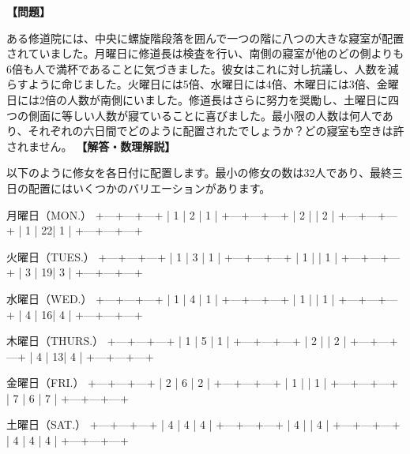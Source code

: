 \documentclass[10pt,a4paper,oneside,openany]{ltjsbook}
\begin{document}
\begin{tcolorbox}[colback=softblue,colframe=primaryblue,title=\textbf{第 278 問：修道院のパズル （原題: A DORMITORY PUZZLE.）},arc=2mm,boxrule=1pt,breakable]
\textbf{【問題】}\par\vspace{0.3em}
ある修道院には、中央に螺旋階段落を囲んで一つの階に八つの大きな寢室が配置されていました。月曜日に修道長は検査を行い、南側の寢室が他のどの側よりも6倍も人で満杯であることに気づきました。彼女はこれに対し抗議し、人数を減らすように命じました。火曜日には5倍、水曜日には4倍、木曜日には3倍、金曜日には2倍の人数が南側にいました。修道長はさらに努力を奨勵し、土曜日に四つの側面に等しい人数が寢ていることに喜びました。最小限の人数は何人であり、それぞれの六日間でどのように配置されたでしょうか？どの寢室も空きは許されません。
\tcblower
\textbf{【解答・数理解説】}\par\vspace{0.3em}
以下のように修女を各日付に配置します。最小の修女の数は32人であり、最終三日の配置にはいくつかのバリエーションがあります。

月曜日（MON.）
+---+---+---+
| 1 | 2 | 1 |
+---+---+---+
| 2 |   | 2 |
+---+---+---+
| 1 | 22| 1 |
+---+---+---+

火曜日（TUES.）
+---+---+---+
| 1 | 3 | 1 |
+---+---+---+
| 1 |   | 1 |
+---+---+---+
| 3 | 19| 3 |
+---+---+---+

水曜日（WED.）
+---+---+---+
| 1 | 4 | 1 |
+---+---+---+
| 1 |   | 1 |
+---+---+---+
| 4 | 16| 4 |
+---+---+---+

木曜日（THURS.）
+---+---+---+
| 1 | 5 | 1 |
+---+---+---+
| 2 |   | 2 |
+---+---+---+
| 4 | 13| 4 |
+---+---+---+

金曜日（FRI.）
+---+---+---+
| 2 | 6 | 2 |
+---+---+---+
| 1 |   | 1 |
+---+---+---+
| 7 | 6 | 7 |
+---+---+---+

土曜日（SAT.）
+---+---+---+
| 4 | 4 | 4 |
+---+---+---+
| 4 |   | 4 |
+---+---+---+
| 4 | 4 | 4 |
+---+---+---+
\end{tcolorbox}
\end{document}
